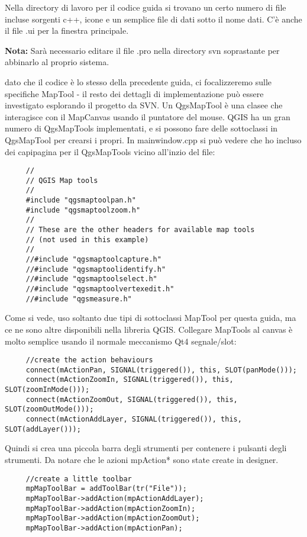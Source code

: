 Nella directory di lavoro per il codice guida si trovano un certo numero di file incluse sorgenti c++, icone e un semplice file di dati sotto il nome dati. C'è anche il file .ui per la finestra principale.

\textbf{Nota:} Sarà necessario editare il file .pro nella directory svn soprastante per abbinarlo al proprio sistema.

dato che il codice è lo stesso della precedente guida, ci focalizzeremo sulle specifiche MapTool - il resto dei dettagli di implementazione può essere investigato esplorando il progetto da SVN. Un QgsMapTool è una clasee che interagisce con il MapCanvas usando il puntatore del mouse. QGIS ha un gran numero di QgsMapTools implementati, e si possono fare delle sottoclassi in QgsMapTool per crearsi i propri. In mainwindow.cpp si può vedere che ho incluso dei capipagina per il QgsMapTools vicino all'inzio del file:

\begin{verbatim}
     //
     // QGIS Map tools
     //
     #include "qgsmaptoolpan.h"
     #include "qgsmaptoolzoom.h"
     //
     // These are the other headers for available map tools 
     // (not used in this example)
     //
     //#include "qgsmaptoolcapture.h"
     //#include "qgsmaptoolidentify.h"
     //#include "qgsmaptoolselect.h"
     //#include "qgsmaptoolvertexedit.h"
     //#include "qgsmeasure.h"
\end{verbatim}

Come si vede, uso soltanto due tipi di sottoclassi MapTool per questa guida, ma ce ne sono altre disponibili nella libreria QGIS. Collegare MapTools al canvas è molto semplice usando il normale meccanismo Qt4 segnale/slot:

\begin{verbatim}
     //create the action behaviours
     connect(mActionPan, SIGNAL(triggered()), this, SLOT(panMode()));
     connect(mActionZoomIn, SIGNAL(triggered()), this, SLOT(zoomInMode()));
     connect(mActionZoomOut, SIGNAL(triggered()), this, SLOT(zoomOutMode()));
     connect(mActionAddLayer, SIGNAL(triggered()), this, SLOT(addLayer()));
\end{verbatim}

Quindi si crea una piccola barra degli strumenti per contenere i pulsanti degli strumenti. Da notare che le azioni mpAction* sono state create in designer.

\begin{verbatim}
     //create a little toolbar
     mpMapToolBar = addToolBar(tr("File"));
     mpMapToolBar->addAction(mpActionAddLayer);
     mpMapToolBar->addAction(mpActionZoomIn);
     mpMapToolBar->addAction(mpActionZoomOut);
     mpMapToolBar->addAction(mpActionPan);
\end{verbatim}


